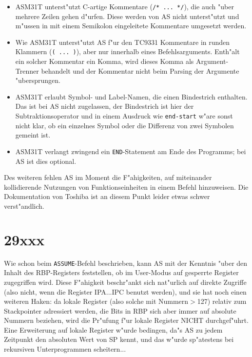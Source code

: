 \documentclass[12pt,a4paper,twoside]{report}
\newcommand{\tty}[1]{{\tt #1}}
\newcommand{\asname}{AS}
\begin{document}
\begin{itemize}
\item{ASM31T unterst"utzt C-artige Kommentare (\verb!/* ... */!),
      die auch "uber mehrere Zeilen gehen d"urfen.  Diese werden
      von \asname{} nicht unterst"utzt und m"ussen in mit einem
      Semikolon eingeleitete Kommentare umgesetzt werden.}
\item{Wie ASM31T unterst"utzt \asname{} f"ur den TC9331 Kommentare in
      runden Klammern (\verb!( ... )!), aber nur innerhalb
      eines Befehlsarguments.  Enth"alt ein solcher Kommentar ein
      Komma, wird dieses Komma als Argument-Trenner behandelt und
      der Kommentar nicht beim Parsing der Argumente
      "ubersprungen.}
\item{ASM31T erlaubt Symbol- und Label-Namen, die einen
      Bindestrich enthalten.  Das ist bei \asname{} nicht zugelassen,
      der Bindestrich ist hier der Subtraktionsoperator und in
      einem Ausdruck wie \verb!end-start! w"are sonst nicht klar,
      ob ein einzelnes Symbol oder die Differenz von zwei
      Symbolen gemeint ist.}
\item{ASM31T verlangt zwingend ein \tty{END}-Statement am Ende
      des Programms; bei \asname{} ist dies optional.}
\end{itemize}

Des weiteren fehlen \asname{} im Moment die F"ahigkeiten, auf
miteinander kollidierende Nutzungen von Funktionseinheiten in
einem Befehl hinzuweisen.  Die Dokumentation von Toshiba ist an
diesem Punkt leider etwas schwer verst"andlich.


\section{29xxx}

Wie schon beim \tty{ASSUME}-Befehl beschrieben, kann \asname{} mit der Kenntnis
"uber den Inhalt des RBP-Registers feststellen, ob im User-Modus
auf gesperrte Register zugegriffen wird.  Diese F"ahigkeit
beschr"ankt sich nat"urlich auf direkte Zugriffe (also nicht, wenn
die Register IPA...IPC benutzt werden), und sie hat noch einen
weiteren Haken: da lokale Register (also solche mit Nummern$>$127)
relativ zum Stackpointer adressiert werden, die Bits in RBP sich
aber immer auf absolute Nummern beziehen, wird die Pr"ufung f"ur
lokale Register NICHT durchgef"uhrt.  Eine Erweiterung auf lokale
Register w"urde bedingen, da"s \asname{} zu jedem Zeitpunkt den absoluten
Wert von SP kennt, und das w"urde sp"atestens bei rekursiven
Unterprogrammen scheitern...
\end{document}

